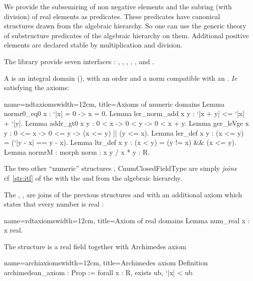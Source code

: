 We provide the subsemiring of non negative elements  and the
subring (with division) of real elements  as predicates. These
predicates have canonical structures drawn from the algebraic
hierarchy. So one can use the generic theory of substructure
predicates of the algebraic hierarchy on them. Additional positive
elements  are declared stable by multiplication and division.

The library provide seven interfaces : ,
, , ,
,  and .

A  is an integral domain (), with an
order and a norm compatible with \C{+} an \C{*}. \textit{Ie}
satisfying the axioms:

\begin{coq}{name=ndtaxioms}{width=12cm, title=Axioms of numeric domains}
Lemma normr0_eq0    x   : `|x| = 0 -> x = 0.
Lemma ler_norm_add  x y : `|x + y| <= `|x| + `|y|.
Lemma addr_gt0      x y : 0 < x -> 0 < y -> 0 < x + y.
Lemma ger_leVge     x y : 0 <= x -> 0 <= y -> (x <= y) || (y <= x).
Lemma ler_def       x y : (x <= y) = (`|y - x| == y - x).
Lemma ltr_def       x y : (x < y) = (y != x) && (x <= y).
Lemma normrM            : {morph norm : x y / x * y : R}.

\end{coq}

The two other ``numeric'' structures ,
C{numClosedFieldType} are simply \emph{joins} cf~\ref{str:itf} of the
 with the  and  from
the algebraic hierarchy.

The , , are joins of the previous
structures  and  with an additional
axiom which states that every number is real :

\begin{coq}{name=rdtaxioms}{width=12cm, title=Axiom of real domains}
Lemma num_real x : x \is real.
\end{coq}

The structure  is a real field together with
Archimedes axiom
\begin{coq}{name=archiaxioms}{width=12cm, title=Archimedes axiom}
Definition archimedean_axiom : Prop := forall x : R, exists ub, `|x| < ub%
\end{coq}

